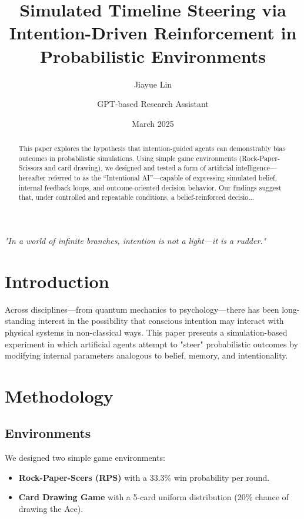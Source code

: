\documentclass{article}
\title{Simulated Timeline Steering via Intention-Driven Reinforcement in Probabilistic Environments}
\author{Jiayue Lin \and GPT-based Research Assistant}
\date{March 2025}
\begin{document}
\maketitle

\begin{center}
\textit{"In a world of infinite branches, intention is not a light—it is a rudder."}
\end{center}

\begin{abstract}
This paper explores the hypothesis that intention-guided agents can demonstrably bias outcomes in probabilistic simulations. Using simple game environments (Rock-Paper-Scissors and card drawing), we designed and tested a form of artificial intelligence—hereafter referred to as the “Intentional AI”—capable of expressing simulated belief, internal feedback loops, and outcome-oriented decision behavior. Our findings suggest that, under controlled and repeatable conditions, a belief-reinforced decisio...
\end{abstract}

\section{Introduction}
Across disciplines—from quantum mechanics to psychology—there has been long-standing interest in the possibility that conscious intention may interact with physical systems in non-classical ways. This paper presents a simulation-based experiment in which artificial agents attempt to "steer" probabilistic outcomes by modifying internal parameters analogous to belief, memory, and intentionality.

\section{Methodology}
\subsection{Environments}
We designed two simple game environments:
\begin{itemize}
    \item \textbf{Rock-Paper-Scers (RPS)} with a 33.3\% win probability per round.
    \item \textbf{Card Drawing Game} with a 5-card uniform distribution (20\% chance of drawing the Ace).
\end{itemize}
\end{document}
